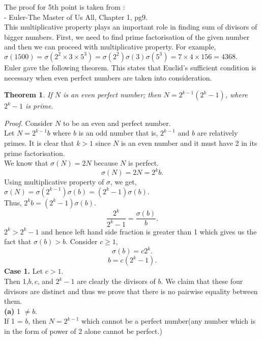 \documentclass[a4paper,reqno,11pt]{book}
\theoremstyle{plain}%
\newtheorem{thm}{Theorem}[chapter]
\theoremstyle{definition}
\begin{document}
The proof for 5th point is taken from :\\
\vspace{2ex}
\hfill {- Euler-The Master of Us All, Chapter 1, pg9.}\\
This multiplicative property plays an important role in finding sum of divisors of bigger numbers. First, we need to find prime factorisation of the given number and then we can proceed with multiplicative property. For example,\\
$\sigma(1500) = \sigma(2^2\times3\times5^3) = \sigma(2^2)\sigma(3)\sigma(5^3) = 7 \times 4 \times 156 = 4368.$\\
Euler gave the following theorem. This states that Euclid's sufficient condition is necessary when even perfect numbers are taken into consideration.\\
\begin{thm}\label{thm:Type 1} If $N$ is an even perfect number; then $N = 2^{k- 1} (2^k-1)$, where $2^k - 1 $ is prime. \\
\end{thm}
\noindent \textit{Proof.} Consider $N$ to be an even and perfect number.\\
Let $N = 2^{k-1}b$ where $b$ is an odd number that is, $2^{k-1}$ and $b$ are relatively primes. It is clear that $k > 1$ since $N$ is an even number and it must have 2 in its prime factorisation.\\
We know that $\sigma(N) = 2N$ because $N$ is perfect.\\
$$\sigma(N) = 2N = 2^kb.$$
Using multiplicative property of $\sigma$, we get,\\
$\sigma(N) = \sigma(2^{k-1})\sigma(b) = (2^k-1)\sigma(b).$\\
Thus, $2^kb = (2^k-1)\sigma(b). $\\
$$\frac{2^k}{2^k-1} = \frac{\sigma(b)}{b}.$$
$2^k > 2^k-1$ and hence left hand side fraction is greater than 1 which gives us the fact that $\sigma(b) > b.$ Consider $c \geq 1$,\\
$$\sigma(b) = c2^k.$$
$$b = c(2^k-1).$$
\textbf{Case 1.} Let $c > 1$.\\
Then 1,$ b, c$, and $2^k - 1$ are clearly the divisors of $b$. We claim that these four divisors are distinct and thus we prove that there is no pairwise equality between them. \\
\textbf{(a)} 1 $\neq b$.\\
If 1 = $b$, then $N=2^{k-1}$ which cannot be a perfect number(any number which is in the form of power of 2 alone cannot be perfect.)\\
\end{document}
